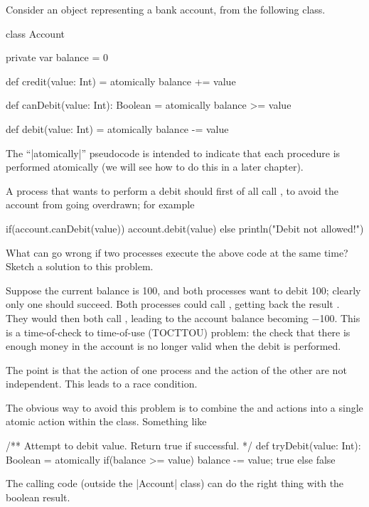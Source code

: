 \begin{question}
Consider an object representing a bank account, from the following class.
%
\begin{scala}
class Account{
  private var balance = 0

  def credit(value: Int) = atomically{ balance += value }

  def canDebit(value: Int): Boolean = atomically{ balance >= value }

  def debit(value: Int) = atomically{ balance -= value }
}
\end{scala}
%
The ``|atomically|'' pseudocode is intended to indicate that each
procedure is performed atomically (we will see how to do this in a
later chapter).

A process that wants to perform a debit should first of all call
, to avoid the account from going overdrawn; for example
%
\begin{scala}[showstringspaces=false]
  if(account.canDebit(value)) account.debit(value)
  else println("Debit not allowed!")
\end{scala}

What can go wrong if two processes execute the above code at the same
time?  Sketch a solution to this problem.
\end{question}


\begin{answer}
Suppose the current balance is 100, and both processes want to debit 100;
clearly only one should succeed.  Both processes could call
, getting back the result .  They would
then both call , leading to the account balance becoming $-$100.
This is a time-of-check to time-of-use (TOCTTOU) problem: the check that there
is enough money in the account is no longer valid when the debit is
performed. 

The point is that the  action of one process and the
 action of the other are not independent.  This leads to a race
condition.

The obvious way to avoid this problem is to combine the  and
 actions into a single atomic action within the 
class.  Something like
%
\begin{scala}
/** Attempt to debit value.  Return true if successful. */
def tryDebit(value: Int): Boolean = atomically{
  if(balance >= value){ balance -= value; true } else false
}
\end{scala}
% 
The calling code (outside the |Account| class) can do the right thing with the
boolean result. 
\end{answer}

